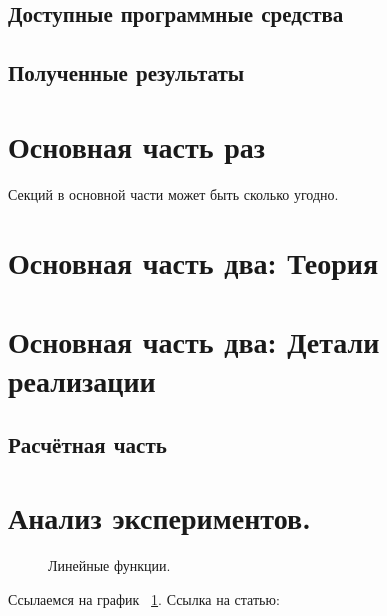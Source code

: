 \documentclass[aps,%
12pt,%
final,%
oneside,
onecolumn,%
musixtex, %
superscriptaddress,%
centertags]{article} %
\begin{document}
\subsection{Доступные программные средства}
\subsection{Полученные результаты} 

\section{Основная часть раз}
Секций в основной части может быть сколько угодно.

\section{Основная часть два: Теория}

\section{Основная часть два: Детали реализации}
\subsection{Расчётная часть}

\section{Анализ экспериментов.}
\begin{figure}[ht]
\begin{center}


\caption{
\label{graph-fig}
     Линейные функции.}
\end {center}
\end {figure}
Ссылаемся на график ~\ref{graph-fig}.
Ссылка на статью: \cite{DBLP:conf/adbis/NovikovP03}
\end{document}
